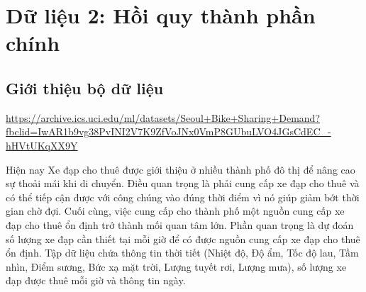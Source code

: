 \section{Dữ liệu 2: Hồi quy thành phần chính}

\subsection*{Giới thiệu bộ dữ liệu}
\url{https://archive.ics.uci.edu/ml/datasets/Seoul+Bike+Sharing+Demand?fbclid=IwAR1b9vg38PvINI2V7K9ZfVoJNx0VmP8GUbuLVO4JGsCdEC_-hHVtUKqXX9Y}

Hiện nay Xe đạp cho thuê được giới thiệu ở nhiều thành phố đô thị để nâng cao sự thoải mái khi di chuyển. Điều quan trọng là phải cung cấp xe đạp cho thuê và có thể tiếp cận được với công chúng vào đúng thời điểm vì nó giúp giảm bớt thời gian chờ đợi. Cuối cùng, việc cung cấp cho thành phố một nguồn cung cấp xe đạp cho thuê ổn định trở thành mối quan tâm lớn. Phần quan trọng là dự đoán số lượng xe đạp cần thiết tại mỗi giờ để có được nguồn cung cấp xe đạp cho thuê ổn định.
Tập dữ liệu chứa thông tin thời tiết (Nhiệt độ, Độ ẩm, Tốc độ lau, Tầm nhìn, Điểm sương, Bức xạ mặt trời, Lượng tuyết rơi, Lượng mưa), số lượng xe đạp được thuê mỗi giờ và thông tin ngày.